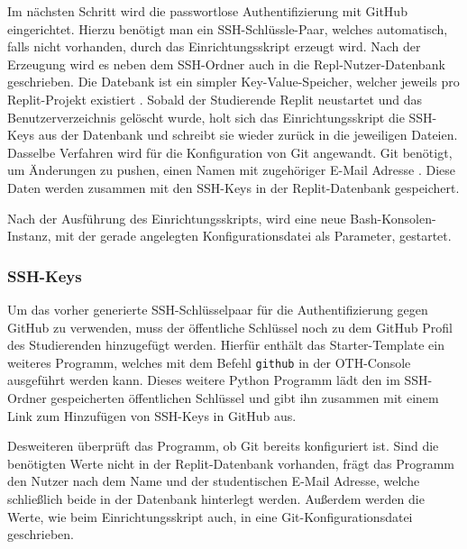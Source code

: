 Im nächsten Schritt wird die passwortlose Authentifizierung mit GitHub
eingerichtet. Hierzu benötigt man ein SSH-Schlüssle-Paar, welches automatisch,
falls nicht vorhanden, durch das Einrichtungsskript erzeugt wird. Nach der
Erzeugung wird es neben dem SSH-Ordner auch in die Repl-Nutzer-Datenbank
geschrieben. Die Datebank ist ein simpler Key-Value-Speicher, welcher jeweils
pro Replit-Projekt existiert \parencite{replit-database}. Sobald der Studierende
Replit neustartet und das Benutzerverzeichnis gelöscht wurde, holt sich das Einrichtungsskript die SSH-Keys aus der Datenbank und schreibt sie wieder
zurück in die jeweiligen Dateien. Dasselbe Verfahren wird für die Konfiguration
von Git angewandt. Git benötigt, um Änderungen zu pushen, einen Namen mit
zugehöriger E-Mail Adresse \parencite{git-config}. Diese Daten werden zusammen mit
den SSH-Keys in der Replit-Datenbank gespeichert.

Nach der Ausführung des Einrichtungsskripts, wird eine neue
Bash-Konsolen-Instanz, mit der gerade angelegten Konfigurationsdatei als
Parameter, gestartet.

\subsubsection{SSH-Keys}\label{replit-template-ssh-keys}
Um das vorher generierte SSH-Schlüsselpaar für die Authentifizierung gegen
GitHub zu verwenden, muss der öffentliche Schlüssel noch zu dem GitHub Profil
des Studierenden hinzugefügt werden. Hierfür enthält das Starter-Template ein
weiteres Programm, welches mit dem Befehl \texttt{github} in der OTH-Console
ausgeführt werden kann. Dieses weitere Python Programm lädt den im SSH-Ordner
gespeicherten öffentlichen Schlüssel und gibt ihn zusammen mit einem Link
zum Hinzufügen von SSH-Keys in GitHub aus.

Desweiteren überprüft das Programm, ob Git bereits konfiguriert ist.
Sind die benötigten Werte nicht in der Replit-Datenbank vorhanden, frägt das
Programm den Nutzer nach dem Name und der studentischen E-Mail Adresse, welche schließlich beide in der Datenbank hinterlegt werden. Außerdem werden die Werte,
wie beim Einrichtungsskript auch, in eine Git-Konfigurationsdatei geschrieben.